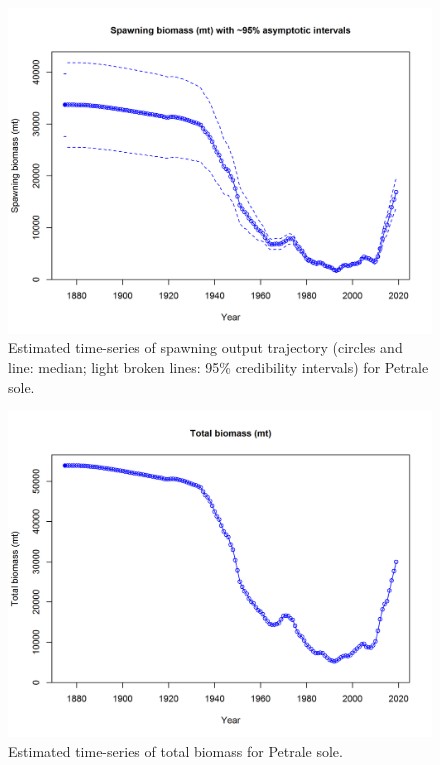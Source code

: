 \documentclass[12pt,]{article}
\begin{document}
\FloatBarrier

\begin{figure}[htbp]
\centering
\includegraphics{r4ss/plots_mod1/ts7_Spawning_biomass_(mt)_with_95_asymptotic_intervals_intervals}
\caption{Estimated time-series of spawning output trajectory (circles
and line: median; light broken lines: 95\% credibility intervals) for
Petrale sole. \label{fig:ssb}}
\end{figure}

\FloatBarrier

\begin{figure}[htbp]
\centering
\includegraphics{r4ss/plots_mod1/ts1_Total_biomass_(mt).png}
\caption{Estimated time-series of total biomass for Petrale sole.
\label{fig:total_bio}}
\end{figure}
\end{document}

